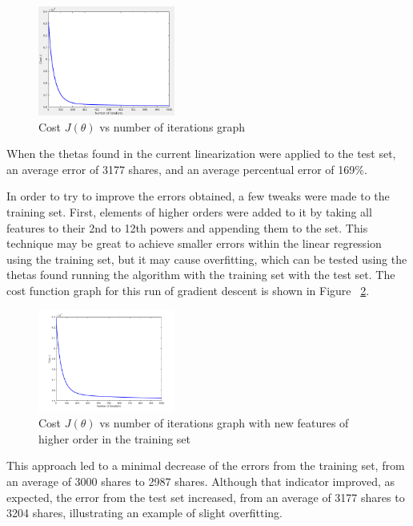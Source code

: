 \documentclass[10pt,twocolumn,letterpaper]{article}
\begin{document}
\begin{figure}[H]
\begin{center}
	\includegraphics[width=0.4\textwidth]{pics/first_run_001_1000}
	\caption{Cost $J(\theta)$ vs number of iterations graph\label{fig:first_run_label}}   
\end{center} 
\end{figure}   

When the thetas found in the current linearization were applied to the test set, an average error of 3177 shares, and an average percentual error of 169$\%$.

In order to try to improve the errors obtained, a few tweaks were made to the training set. First, elements of higher orders were added to it by taking all features to their 2nd to 12th powers and appending them to the set. This technique may be great to achieve smaller errors within the linear regression using the training set, but it may cause overfitting, which can be tested using the thetas found running the algorithm with the training set with the test set. The cost function graph for this run of gradient descent is shown in Figure ~\ref{fig:second_run_label}.

\begin{figure}[H]
\begin{center}
	\includegraphics[width=0.4\textwidth]{pics/power_12_wo_reg}
	\caption{Cost $J(\theta)$ vs number of iterations graph with new features of higher order in the training set\label{fig:second_run_label}}
\end{center} 
\end{figure}   

This approach led to a minimal decrease of the errors from the training set, from an average of 3000 shares to 2987 shares. Although that indicator improved, as expected, the error from the test set increased, from an average of 3177 shares to 3204 shares, illustrating an example of slight overfitting. 
\end{document}

